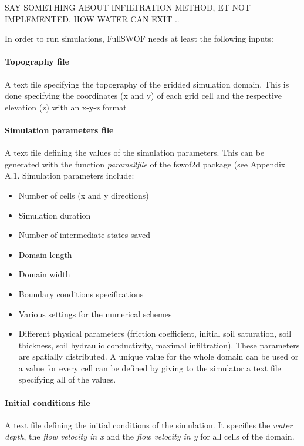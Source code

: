 SAY SOMETHING ABOUT INFILTRATION METHOD, ET NOT IMPLEMENTED, HOW WATER CAN EXIT .. 

In order to run simulations, FullSWOF needs at least the following inputs:
\paragraph{Topography file} A text file specifying the topography of the gridded simulation domain. This is done specifying the coordinates (x and y) of each grid cell and the respective elevation (z) with an x-y-z format 

\paragraph{Simulation parameters file} A text file defining the values of the simulation parameters. This can be generated with the function \textit{params2file} of the fswof2d package (see Appendix A.1.
Simulation parameters include:

\begin{itemize}
\itemsep0em
  \item Number of cells (x and y directions)
  \item Simulation duration
  \item Number of intermediate states saved
  \item Domain length
  \item Domain width
  \item Boundary conditions specifications
  \item Various settings for the numerical schemes
  \item Different physical parameters (friction coefficient, initial soil saturation, soil thickness, soil hydraulic conductivity, maximal infiltration). These parameters are spatially distributed. A unique value for the whole domain can be used or a value for every cell can be defined by giving to the simulator a text file specifying all of the values.\\
\end{itemize}

\paragraph{Initial conditions file} A text file defining the initial conditions of the simulation. It specifies the \emph{water depth}, the \emph{flow velocity in x} and the \emph{flow velocity in y} for all cells of the domain. \\ %

